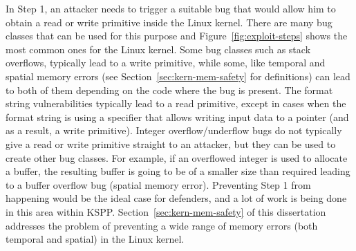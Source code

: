 In Step 1, an attacker needs to trigger a suitable bug that would allow him to obtain a read or write primitive inside the Linux kernel. There are many bug classes that can be used for this purpose and Figure~\ref{fig:exploit-steps} shows the most common ones for the Linux kernel. Some bug classes such as stack overflows, typically lead to a write primitive, while some, like temporal and spatial memory errors (see Section~\ref{sec:kern-mem-safety} for definitions) can lead to both of them depending on the code where the bug is present. The format string vulnerabilities typically lead to a read primitive, except in cases when the format string is using a  specifier that allows writing input data to a pointer (and as a result, a write primitive). Integer overflow/underflow bugs do not typically give a read or write primitive straight to an attacker, but they can be used to create other bug classes. For example, if an overflowed integer is used to allocate a buffer, the resulting buffer is going to be of a smaller size than required leading to a buffer overflow bug (spatial memory error). Preventing Step 1 from happening would be the ideal case for defenders, and a lot of work is being done in this area within KSPP. Section~\ref{sec:kern-mem-safety} of this dissertation addresses the problem of preventing a wide range of memory errors (both temporal and spatial) in the Linux kernel. 

